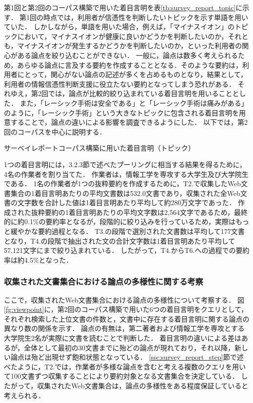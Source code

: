 \documentclass[japanese]{jnlp_1.4}
\begin{document}
第1回と第2回のコーパス構築で用いた着目言明を表\ref{tb:survey_report_topic}に示す．
第1回の時点では，利用者が信憑性を判断したいトピックを示す単語を用いていた．
しかしながら，単語を用いた場合，例えば，「マイナスイオン」のトピックにおいて，マイナスイオンが健康に良いかどうかを判断したいのか，それとも，マイナスイオンが発生するかどうかを判断したいのか，といった利用者の関心がある論点を絞り込むことができない．
一般に，論点は数多く考えられるため，あらゆる論点に言及する要約を作成することとなる．そのような要約は，利用者にとって，関心がない論点の記述が多くを占めるものとなり，結果として，利用者の情報信憑性判断支援に役立たない要約となってしまう恐れがある．
それゆえ，第2回では，論点が比較的絞り込まれている着目言明を用いることとした．
また，「レーシック手術は安全である」と「レーシック手術は痛みがある」のように，「レーシック手術」という大きなトピックに包含される着目言明を用意することで，論点の違いによる影響を調査できるようにした．
以下では，第2回のコーパスを中心に説明する．

\begin{table}[t]
 \caption{サーベイレポートコーパス構築に用いた着目言明（トピック）}
 \label{tb:survey_report_topic}

\end{table}

1つの着目言明には，3.2.3節で述べたプーリングに相当する結果を得るために，4名の作業者を割り当てた．
作業者は，情報工学を専攻する大学生及び大学院生である．
1名の作業者が1つの抜粋要約を作成するために，T2.で収集したWeb文書集合の1着目言明あたりの平均文書数は532.0文書であり，収集された全Web文書の文字数を合計した値は1着目言明あたり平均して約280万文字であった．
作成された抜粋要約の1着目言明あたりの平均文字数は2,564文字であるため，最終的に約0.1\%の要約率となるが，段階的に絞り込みを行っているため，実際はもっと緩やかな要約過程となる．
T3.の段階で選別された文書数は平均して177文書となり，T4.の段階で抽出された文の合計文字数は1着目言明あたり平均して57,121文字にまで絞り込まれている．
したがって，T4.からT6.への過程での要約率は約4.5\%となった．


\subsubsection{収集された文書集合における論点の多様性に関する考察}

ここで，収集されたWeb文書集合における論点の多様性について考察する．
図\ref{fg:viewpoint}に，第2回のコーパス構築で用いた6つの着目言明をクエリとして，それぞれ検索した上位文書の件数と，文書中に存在する着目言明に関する論点の異なり数の関係を示す．
論点の有無は，第二著者および情報工学を専攻とする大学院生2名が実際に文書を読むことで判断した．
着目言明の違いによる差はあるが，全体として最初の30文書までに殆どの論点が現れており，それ以降，新しい論点は殆ど出現せず飽和状態となっている．
\ref{ssc:survey_report_step}節で述べたように，T2.では，作業者が多様な論点を含むと考える複数のクエリを用いて100文書ずつ収集することにより要約対象となる文書集合を決定している．
したがって，収集されたWeb文書集合は，論点の多様性をある程度保証していると考えられる．
\end{document}
